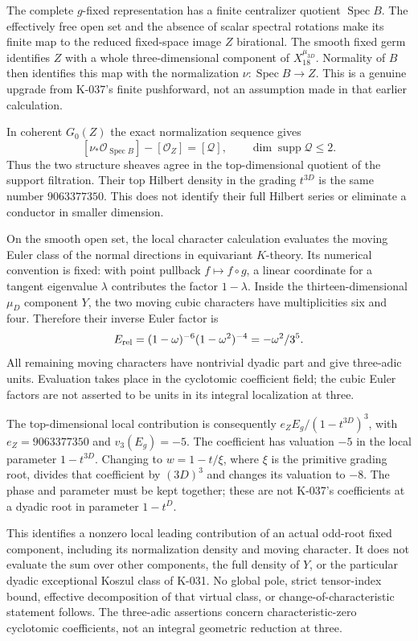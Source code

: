 The complete $g$-fixed representation has a finite centralizer quotient
$\operatorname{Spec}B$. The effectively free open set and the absence
of scalar spectral rotations make its finite map to the reduced
fixed-space image $Z$ birational. The smooth fixed germ identifies
$Z$ with a whole three-dimensional component of
$X_{18}^{\mu_{3D}}$. Normality of $B$ then identifies this map with
the normalization $\nu:\operatorname{Spec}B\to Z$.
This is a genuine upgrade from K-037's finite pushforward, not an
assumption made in that earlier calculation.

In coherent $G_0(Z)$ the exact normalization sequence gives
\[
 [\nu_*\mathcal O_{\operatorname{Spec}B}]
       -[\mathcal O_Z]=[\mathcal Q],\qquad
                  \dim\operatorname{supp}\mathcal Q\le2.
\]
Thus the two structure sheaves agree in the top-dimensional quotient
of the support filtration. Their top Hilbert density in the grading
$t^{3D}$ is the same number $9063377350$. This does not identify their
full Hilbert series or eliminate a conductor in smaller dimension.

On the smooth open set, the local character calculation evaluates the
moving Euler class of the normal directions in equivariant $K$-theory.
Its numerical convention is fixed: with point pullback
$f\mapsto f\circ g$, a linear coordinate for a tangent eigenvalue
$\lambda$ contributes the factor $1-\lambda$.
Inside the thirteen-dimensional $\mu_D$ component $Y$, the two moving
cubic characters have multiplicities six and four. Therefore their
inverse Euler factor is
\[
 E_{\rm rel}=(1-\omega)^{-6}(1-\omega^2)^{-4}
                    =-\omega^2/3^5.
\]
All remaining moving characters have nontrivial dyadic part and
give three-adic units. Evaluation takes place in the cyclotomic
coefficient field; the cubic Euler factors are not asserted to be
units in its integral localization at three.

The top-dimensional local contribution is consequently
$e_ZE_g/(1-t^{3D})^3$, with $e_Z=9063377350$ and
$v_3(E_g)=-5$. The coefficient has valuation $-5$ in the local
parameter $1-t^{3D}$. Changing to $w=1-t/\xi$, where $\xi$ is the
primitive grading root, divides that coefficient by $(3D)^3$ and
changes its valuation to $-8$. The phase and parameter must be kept
together; these are not K-037's coefficients at a dyadic root in
parameter $1-t^D$.

This identifies a nonzero local leading contribution of an actual
odd-root fixed component, including its normalization density and
moving character. It does not evaluate the sum over other components,
the full density of $Y$, or the particular dyadic exceptional Koszul
class of K-031. No global pole, strict tensor-index bound, effective
decomposition of that virtual class, or change-of-characteristic
statement follows. The three-adic assertions concern characteristic-zero
cyclotomic coefficients, not an integral geometric reduction at three.
